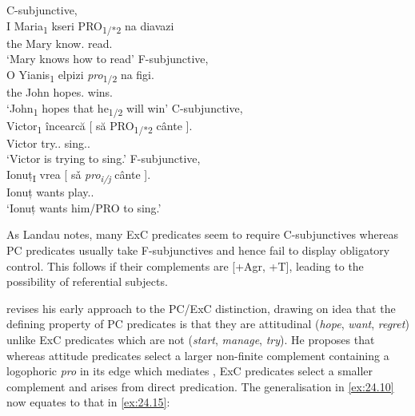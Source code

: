 \documentclass[output=paper]{langsci/langscibook}
\begin{document}
\ea\label{ex:24.11} C-subjunctive, \\
    \gll I Maria\textsubscript{1}   kseri PRO\textsubscript{1/*2} na   diavazi \\
		the Mary   know.\Tsg{} {}  \Ptcl{}   read.\Tsg{}\\
	\glt ‘Mary knows how to read’
\ex\label{ex:24.12} F-subjunctive,  \parencite[(21)]{Varlokosta1994}\\
	\gll O Yianis\textsubscript{1}   elpizi  \emph{pro}\textsubscript{1/2} na   figi. \\
		the John   hopes.\Tsg{} {}    \Ptcl{}   wins.\Tsg{} \\
	\glt ‘John\textsubscript{1} hopes that he\textsubscript{1/2} will win’
\ex\label{ex:24.13} C-subjunctive,  \parencite[6]{Alboiu2007}\\
	\gll Victor\textsubscript{1}  încearcă   [ să          PRO\textsubscript{1/*2} cânte ].\\
        Victor    try.\Prs.\Tsg{} {} \Sbjv{} {}    sing.\Sbjv.\Tsg{}\\
	\glt ‘Victor is trying to sing.’
\ex\label{ex:24.14} F-subjunctive, \\
	\gll Ionuț\textsubscript{I} vrea  [ sǎ     \emph{pro\textsubscript{i/j}}\textsubscript{}  cânte ].\\
            Ionuț    wants {}  \Sbjv{} {} play.\Sbjv{}.\Tsg{}\\
	\glt ‘Ionuț wants him/PRO to sing.’
\z

As Landau notes, many \gls{ExC} predicates seem
to require C-subjunctives where\-as \gls{PC}
predicates usually take F-subjunctives and hence fail to display obligatory
control. This follows if their complements are [+Agr, +T], leading to the
possibility of referential subjects.

\citet{Landau2015} revises his early approach to the \gls{PC}/\gls{ExC}
distinction, drawing on  idea that the defining property
of \gls{PC} predicates is that they are attitudinal
(\emph{hope}, \emph{want}, \emph{regret}) unlike
\gls{ExC} predicates which are not
(\emph{start}, \emph{manage}, \emph{try}). He proposes that whereas attitude
predicates select a larger non-finite complement containing a logophoric
\emph{pro} in its edge which mediates , \gls{ExC} predicates select a smaller complement and  arises from direct
predication. The generalisation in \eqref{ex:24.10} now equates to that in
\eqref{ex:24.15}:
\end{document}
